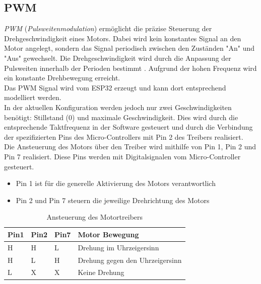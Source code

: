 \documentclass[conference,compsoc,final,a4paper]{IEEEtran}
\begin{document}
\subsection{PWM}
\emph{PWM} (\emph{Pulsweitenmodulation}) ermöglicht die präzise Steuerung der Drehgeschwindigkeit eines Motors. Dabei wird kein konstantes Signal an den Motor angelegt,
sondern das Signal periodisch zwischen den Zuständen "An" und "Aus" gewechselt. Die Drehgeschwindigkeit wird durch die Anpassung der Pulsweiten innerhalb der Perioden 
bestimmt \autocite{611797}. Aufgrund der hohen Frequenz wird ein konstante Drehbewegung erreicht. 
\\

\noindent Das PWM Signal wird vom ESP32 erzeugt und kann dort entsprechend modelliert werden. 
\\

\noindent In der aktuellen Konfiguration werden jedoch nur zwei Geschwindigkeiten benötigt: Stillstand (0) und maximale Geschwindigkeit. 
Dies wird durch die entsprechende Taktfrequenz in der Software gesteuert und durch die Verbindung der 
spezifizierten Pins des Micro-Controllers mit Pin 2 des Treibers realisiert.
\\

\noindent Die Ansteuerung des Motors über den Treiber wird mithilfe von Pin 1, Pin 2 und Pin 7 realisiert. 
Diese Pins werden mit Digitalsignalen vom Micro-Controller gesteuert.
\begin{itemize}
  \item Pin 1 ist für die generelle Aktivierung des Motors verantwortlich
  \item Pin 2 und Pin 7 steuern die jeweilige Drehrichtung des Motors
\end{itemize}

\begin{table}[h]
  \caption{Ansteuerung des Motortreibers \autocite{l293DataSheet}}
  \label{AnsteuerungMotor}
  \centering
  \begin{tabular}{llll}
    \toprule
    \textbf{Pin1} & \textbf{Pin2} & \textbf{Pin7} & \textbf{Motor Bewegung}  \\ 
    \midrule
    H             & H             & L             & Drehung im Uhrzeigersinn        \\
    H             & L             & H             & Drehung gegen den Uhrzeigersinn \\
    L             & X             & X             & Keine Drehung                   \\ 
    \bottomrule
  \end{tabular}
  \end{table}
  
\end{document}
